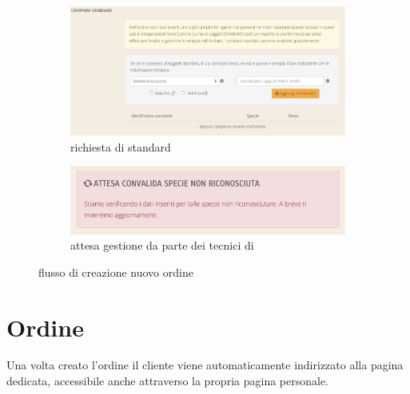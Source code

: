 \begin{figure}
 \begin{subfigure}[b]{0.6\textwidth}
   \includegraphics[width=\textwidth]{images/cl-nuovo-ordine-r-standard} 
   \caption{richiesta di standard}
   \label{fig:cl-nuovo-ordine-r-standard}
 \end{subfigure}
 \begin{subfigure}[b]{0.45\textwidth}
   \includegraphics[width=\textwidth]{images/cl-nuovo-ordine-attesa}
   \caption{attesa gestione da parte dei tecnici di {\fem}}
   \label{fig:cl-nuovo-ordine-attesa} 
 \end{subfigure}
 \caption{flusso di creazione nuovo ordine}
\end{figure}

\section*{Ordine}
Una volta creato l'ordine il cliente viene automaticamente indirizzato alla pagina dedicata, accessibile anche attraverso la propria pagina personale.

